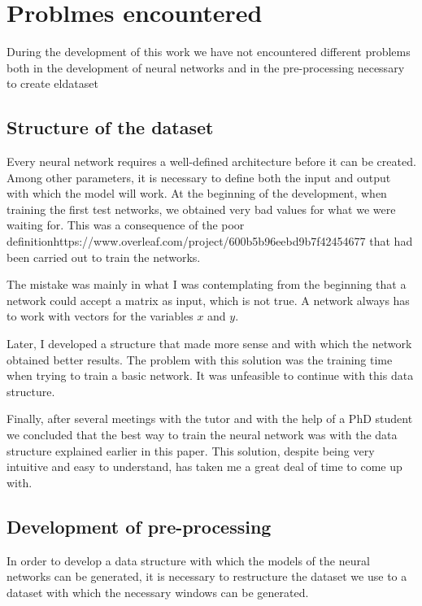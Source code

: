 \section{Problmes encountered}

During the development of this work we have not encountered different problems both in the development of neural networks and in the pre-processing necessary to create eldataset

\subsection{Structure of the dataset}
Every neural network requires a well-defined architecture before it can be created. Among other parameters, it is necessary to define both the input and output with which the model will work. At the beginning of the development, when training the first test networks, we obtained very bad values for what we were waiting for. This was a consequence of the poor definitionhttps://www.overleaf.com/project/600b5b96eebd9b7f42454677 that had been carried out to train the networks.
\newline

The mistake was mainly in what I was contemplating from the beginning that a network could accept a matrix as input, which is not true. A network always has to work with vectors for the variables $x$ and $y$.
\newline

Later, I developed a structure that made more sense and with which the network obtained better results. The problem with this solution was the training time when trying to train a basic network. It was unfeasible to continue with this data structure.
\newline

Finally, after several meetings with the tutor and with the help of a PhD student we concluded that the best way to train the neural network was with the data structure explained earlier in this paper. This solution, despite being very intuitive and easy to understand, has taken me a great deal of time to come up with.


\subsection{Development of pre-processing}
In order to develop a data structure with which the models of the neural networks can be generated, it is necessary to restructure the dataset we use to a dataset with which the necessary windows can be generated.
\newline


